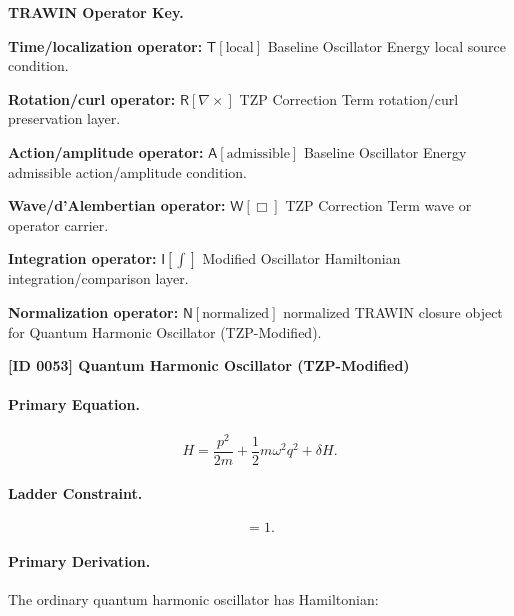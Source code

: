 \par\vspace{0.45\baselineskip}
\noindent\begin{minipage}[t]{\linewidth}
\begingroup
\small
\raggedright
\textbf{TRAWIN Operator Key.}\par
\noindent\textbf{Time/localization operator:} $\mathsf{T}\!\left[\mathrm{local}\right]$ Baseline Oscillator Energy local source condition.\par
\noindent\textbf{Rotation/curl operator:} $\mathsf{R}\!\left[\nabla\times\right]$ TZP Correction Term rotation/curl preservation layer.\par
\noindent\textbf{Action/amplitude operator:} $\mathsf{A}\!\left[\mathrm{admissible}\right]$ Baseline Oscillator Energy admissible action/amplitude condition.\par
\noindent\textbf{Wave/d'Alembertian operator:} $\mathsf{W}\!\left[\Box\right]$ TZP Correction Term wave or operator carrier.\par
\noindent\textbf{Integration operator:} $\mathsf{I}\!\left[\int\right]$ Modified Oscillator Hamiltonian integration/comparison layer.\par
\noindent\textbf{Normalization operator:} $\mathsf{N}\!\left[\mathrm{normalized}\right]$ normalized TRAWIN closure object for Quantum Harmonic Oscillator (TZP-Modified).\par
\endgroup
\end{minipage}

\clearpage
\noindent\textbf{[ID 0053] Quantum Harmonic Oscillator (TZP-Modified)}\par
\vspace{0.35em}
\paragraph{Primary Equation.}
\begin{equation}
H
=
\frac{p^2}{2m}
+
\frac{1}{2}m\omega^2 q^2
+
\delta H .
\end{equation}

\paragraph{Ladder Constraint.}
\begin{equation}
[a,a^\dagger]=1 .
\end{equation}

\paragraph{Primary Derivation.}
The ordinary quantum harmonic oscillator has Hamiltonian:

